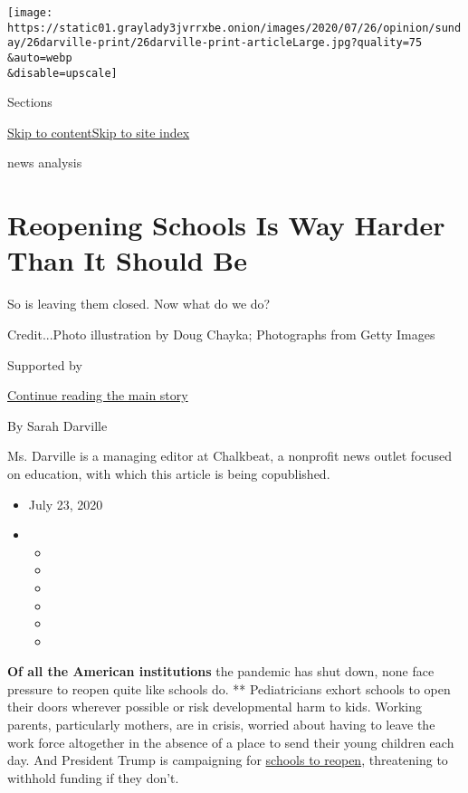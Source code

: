 \texttt{[image: https://static01.graylady3jvrrxbe.onion/images/2020/07/26/opinion/sunday/26darville-print/26darville-print-articleLarge.jpg?quality=75\\\&auto=webp\\\&disable=upscale]}

Sections

\protect\hyperlink{site-content}{Skip to
content}\protect\hyperlink{site-index}{Skip to site index}

news analysis

\hypertarget{reopening-schools-is-way-harder-than-it-should-be}{%
\section{Reopening Schools Is Way Harder Than It Should
Be}\label{reopening-schools-is-way-harder-than-it-should-be}}

So is leaving them closed. Now what do we do?

Credit...Photo illustration by Doug Chayka; Photographs from Getty
Images

Supported by

\protect\hyperlink{after-sponsor}{Continue reading the main story}

By Sarah Darville

Ms. Darville is a managing editor at Chalkbeat, a nonprofit news outlet
focused on education, with which this article is being copublished.

\begin{itemize}
\item
  July 23, 2020
\item
  \begin{itemize}
  \item
  \item
  \item
  \item
  \item
  \item
  \end{itemize}
\end{itemize}

\textbf{Of all the American institutions} the pandemic has shut down,
none face pressure to reopen quite like schools do. ** Pediatricians
exhort schools to open their doors wherever possible or risk
developmental harm to kids. Working parents, particularly mothers, are
in crisis, worried about having to leave the work force altogether in
the absence of a place to send their young children each day. And
President Trump is campaigning for
\href{https://www.nytimes3xbfgragh.onion/2020/08/14/nyregion/nyc-schools-reopening-plan.html}{schools
to reopen}, threatening to withhold funding if they don't.

